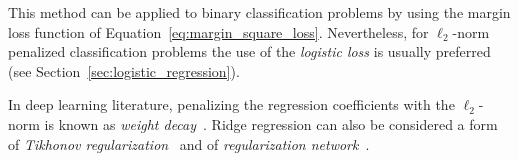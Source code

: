 			This method can be applied to binary classification problems by using the margin loss function of Equation~\eqref{eq:margin_square_loss}. Nevertheless, for $\ell_2$-norm penalized classification problems the use of the \textit{logistic loss} is usually preferred (see Section~\ref{sec:logistic_regression}).

			In deep learning literature, penalizing the regression coefficients with the $\ell_2$-norm is known as \textit{weight decay}~\cite{krogh1992simple}. Ridge regression can also be considered a form of  \textit{Tikhonov regularization}~\cite{tikhonov1963solution} and of \textit{regularization network}~\cite{evgeniou2000regularization}.

